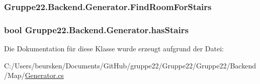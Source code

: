 \hypertarget{class_gruppe22_1_1_backend_1_1_generator_a906ef2c015d9023394368b450dabbcdc}{
\subsubsection[{Find\-Room\-For\-Stairs}]{ Gruppe22.\-Backend.\-Generator.\-Find\-Room\-For\-Stairs\hspace{0.3cm}{\ttfamily [get]}}}\label{class_gruppe22_1_1_backend_1_1_generator_a906ef2c015d9023394368b450dabbcdc}
\hypertarget{class_gruppe22_1_1_backend_1_1_generator_acd434164e04bd866a5130d6333cc9b62}{
\subsubsection[{has\-Stairs}]{\setlength{\rightskip}{0pt plus 5cm}bool Gruppe22.\-Backend.\-Generator.\-has\-Stairs\hspace{0.3cm}{\ttfamily [get]}}}\label{class_gruppe22_1_1_backend_1_1_generator_acd434164e04bd866a5130d6333cc9b62}


Die Dokumentation für diese Klasse wurde erzeugt aufgrund der Datei\-:\begin{DoxyCompactItemize}
\item 
C\-:/\-Users/beursken/\-Documents/\-Git\-Hub/gruppe22/\-Gruppe22/\-Gruppe22/\-Backend/\-Map/\hyperlink{_generator_8cs}{Generator.\-cs}\end{DoxyCompactItemize}
